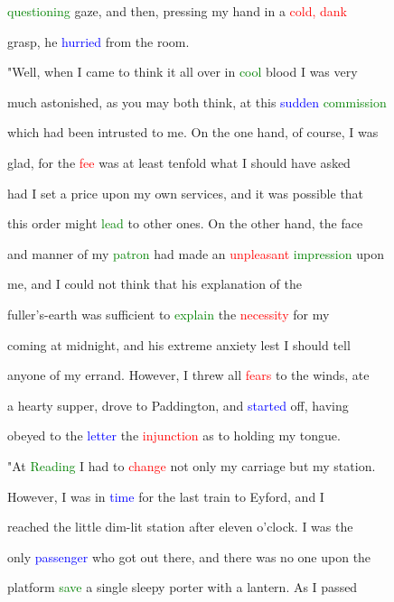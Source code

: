  \textcolor{green}{questioning} gaze, and then, pressing my hand in a \textcolor{red}{cold,} \textcolor{red}{dank}

 grasp, he \textcolor{blue}{hurried} from the room.



 "Well, when I came to think it all over in \textcolor{green}{cool} blood I was very

 much astonished, as you may both think, at this \textcolor{blue}{sudden} \textcolor{green}{commission}

 which had been intrusted to me. On the one hand, of course, I was

 \textcolor{BurntOrange}{glad,} for the \textcolor{red}{fee} was at least tenfold what I should have asked

 had I set a price upon my own services, and it was possible that

 this order might \textcolor{green}{lead} to other ones. On the other hand, the face

 and manner of my \textcolor{green}{patron} had made an \textcolor{red}{unpleasant} \textcolor{green}{impression} upon

 me, and I could not think that his explanation of the

 fuller's-earth was sufficient to \textcolor{green}{explain} the \textcolor{red}{necessity} for my

 coming at midnight, and his extreme \textcolor{BurntOrange}{anxiety} lest I should tell

 anyone of my \textcolor{BurntOrange}{errand.} However, I threw all \textcolor{red}{fears} to the winds, ate

 a hearty supper, drove to Paddington, and \textcolor{blue}{started} off, having

 obeyed to the \textcolor{blue}{letter} the \textcolor{red}{injunction} as to holding my tongue.



 "At \textcolor{green}{Reading} I had to \textcolor{red}{change} not only my carriage but my station.

 However, I was in \textcolor{blue}{time} for the last train to Eyford, and I

 reached the little dim-lit station after eleven o'clock. I was the

 only \textcolor{blue}{passenger} who got out there, and there was no one upon the

 platform \textcolor{green}{save} a single sleepy porter with a lantern. As I passed

